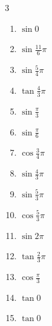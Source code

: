 \begin{multicols}{3}
\begin{enumerate}
  \item $\displaystyle \sin{0}$
        \phantom{$\displaystyle =0$}

  \item $\displaystyle \sin{\frac{11}{6}\pi}$

\columnbreak %

  \item $\displaystyle \sin{\frac{5}{4}\pi}$

  \item $\displaystyle \tan{\frac{4}{3}\pi}$

  \item $\displaystyle \sin{\frac{\pi}{3}}$

  \item $\displaystyle \sin{\frac{\pi}{6}}$

  \item $\displaystyle \cos{\frac{3}{4}\pi}$

  \item $\displaystyle \sin{\frac{4}{3}\pi}$

  \item $\displaystyle \sin{\frac{5}{3}\pi}$

  \item $\displaystyle \cos{\frac{5}{3}\pi}$

  \item $\displaystyle \sin{2\pi}$
        \phantom{$\displaystyle =0$}

  \item $\displaystyle \tan{\frac{2}{3}\pi}$

  \item $\displaystyle \cos{\frac{\pi}{3}}$

  \item $\displaystyle \tan{0}$
        \phantom{$\displaystyle =0$}

  \item $\displaystyle \tan{0}$
        \phantom{$\displaystyle =0$}


\end{enumerate}
\end{multicols}
